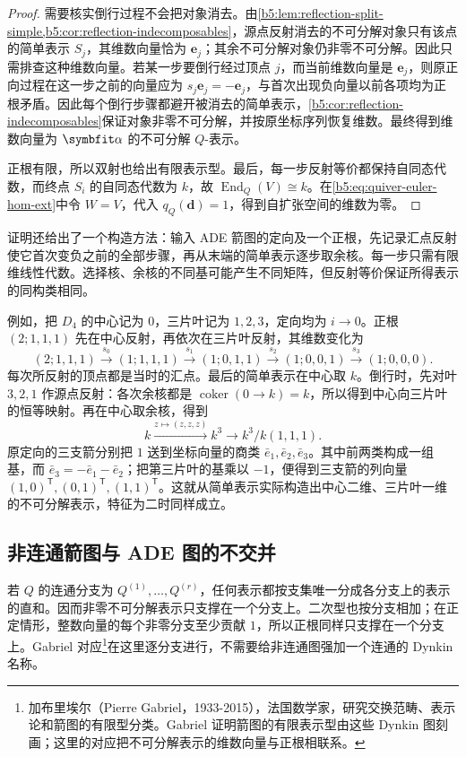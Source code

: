 \begin{proof}
	需要核实倒行过程不会把对象消去。由\cref{b5:lem:reflection-split-simple,b5:cor:reflection-indecomposables}，源点反射消去的不可分解对象只有该点的简单表示 \(S_j\)，其维数向量恰为 \(\mathbf e_j\)；其余不可分解对象仍非零不可分解。因此只需排查这种维数向量。若某一步要倒行经过顶点 \(j\)，而当前维数向量是 \(\mathbf e_j\)，则原正向过程在这一步之前的向量应为 \(s_j\mathbf e_j=-\mathbf e_j\)，与首次出现负向量以前各项均为正根矛盾。因此每个倒行步骤都避开被消去的简单表示，\cref{b5:cor:reflection-indecomposables}保证对象非零不可分解，并按原坐标序列恢复维数。最终得到维数向量为 \(\symbfit\alpha\) 的不可分解 \(Q\)-表示。

	正根有限，所以双射也给出有限表示型。最后，每一步反射等价都保持自同态代数，而终点 \(S_i\) 的自同态代数为 \(k\)，故 \(\operatorname{End}_Q(V)\cong k\)。在\eqref{b5:eq:quiver-euler-hom-ext}中令 \(W=V\)，代入 \(q_Q(\mathbf d)=1\)，得到自扩张空间的维数为零。
\end{proof}

证明还给出了一个构造方法：输入 ADE 箭图的定向及一个正根，先记录汇点反射使它首次变负之前的全部步骤，再从末端的简单表示逐步取余核。每一步只需有限维线性代数。选择核、余核的不同基可能产生不同矩阵，但反射等价保证所得表示的同构类相同。

\ProseParagraphBreak

例如，把 \(D_4\) 的中心记为 \(0\)，三片叶记为 \(1,2,3\)，定向均为 \(i\to0\)。正根 \((2;1,1,1)\) 先在中心反射，再依次在三片叶反射，其维数变化为
\[
	(2;1,1,1)\xrightarrow{s_0}(1;1,1,1) \xrightarrow{s_1}(1;0,1,1) \xrightarrow{s_2}(1;0,0,1) \xrightarrow{s_3}(1;0,0,0).
\]
每次所反射的顶点都是当时的汇点。最后的简单表示在中心取 \(k\)。倒行时，先对叶 \(3,2,1\) 作源点反射：各次余核都是 \(\operatorname{coker}(0\to k)=k\)，所以得到中心向三片叶的恒等映射。再在中心取余核，得到
\[
	k\xrightarrow{z\mapsto(z,z,z)}k^3 \longrightarrow k^3/k(1,1,1).
\]
原定向的三支箭分别把 \(1\) 送到坐标向量的商类 \(\bar e_1,\bar e_2,\bar e_3\)。其中前两类构成一组基，而 \(\bar e_3=-\bar e_1-\bar e_2\)；把第三片叶的基乘以 \(-1\)，便得到三支箭的列向量 \((1,0)^{\mathsf T},(0,1)^{\mathsf T},(1,1)^{\mathsf T}\)。这就从简单表示实际构造出中心二维、三片叶一维的不可分解表示，特征为二时同样成立。

\subsection{非连通箭图与 ADE 图的不交并}
\label{b5:subsec:1003:05}

若 \(Q\) 的连通分支为 \(Q^{(1)},\ldots,Q^{(r)}\)，任何表示都按支集唯一分成各分支上的表示的直和。因而非零不可分解表示只支撑在一个分支上。二次型也按分支相加；在正定情形，整数向量的每个非零分支至少贡献 \(1\)，所以正根同样只支撑在一个分支上。Gabriel 对应\footnote{加布里埃尔（Pierre Gabriel，1933-2015），法国数学家，研究交换范畴、表示论和箭图的有限型分类。Gabriel 证明箭图的有限表示型由这些 Dynkin 图刻画；这里的对应把不可分解表示的维数向量与正根相联系。}在这里逐分支进行，不需要给非连通图强加一个连通的 Dynkin 名称。

